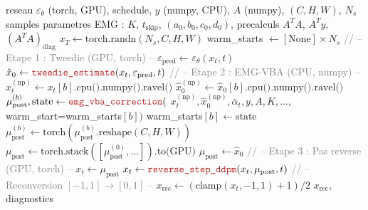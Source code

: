 \documentclass[12pt]{article}
\newcommand{\N}{\mathcal{N}}
\newcommand{\abar}{\bar{\alpha}}
\newcommand{\xhat}{\hat{x}_0}
\newcommand{\mupost}{\mu_{\mathrm{post}}}
\newcommand{\file}[1]{\texttt{\color{codeblue}#1}}
\newcommand{\func}[1]{\texttt{\color{codered}#1}}
\begin{document}
\begin{algorithm}[H]
\caption{Echantillonnage conditionnel complet --- \file{Reverse.py} $\to$ \func{sample\_conditional}}
\begin{algorithmic}[1]
\Require reseau $\varepsilon_\theta$ (torch, GPU), schedule, $y$ (numpy, CPU), $A$ (numpy), $(C,H,W)$, $N_s$ samples
\Require parametres EMG : $K$, $t_{\text{skip}}$, $(a_0, b_0, c_0, d_0)$, precalculs $A^TA$, $A^Ty$, $(A^TA)_{\text{diag}}$
\State
\State $x_T \gets \text{torch.randn}(N_s, C, H, W)$ \Comment{$x_T \sim \N(0,I)$, GPU}
\State warm\_starts $\gets [\text{None}] \times N_s$ 
\State
{} 
  \State
  \State \textcolor{gray}{// -- Etape 1 : Tweedie (GPU, torch) --}
  \State $\varepsilon_{\text{pred}} \gets \varepsilon_\theta(x_t, t)$ 
  \State $\xhat \gets \func{tweedie\_estimate}(x_t, \varepsilon_{\text{pred}}, t)$ 
  \State
  \State \textcolor{gray}{// -- Etape 2 : EMG-VBA (CPU, numpy) --}
   
      \State $x_t^{(\text{np})} \gets x_t[b].\text{cpu().numpy().ravel()}$ 
      \State $\xhat^{(\text{np})} \gets \xhat[b].\text{cpu().numpy().ravel()}$
      \State
      \State $\mupost^{(b)}, \text{state} \gets \func{emg\_vba\_correction}($
      \State \qquad $x_t^{(\text{np})}, \xhat^{(\text{np})}, \abar_t, y, A, K, \ldots,$ warm\_start=warm\_starts$[b])$
      \State
      \State warm\_starts$[b] \gets \text{state}$ 
      \State $\mupost^{(b)} \gets \text{torch}(\mupost^{(b)}.\text{reshape}(C,H,W))$ 
    \EndFor
    \State $\mupost \gets \text{torch.stack}([\mupost^{(0)}, \ldots]).\text{to(GPU)}$
  \Else
    \State $\mupost \gets \xhat$ 
  \EndIf
  \State
  \State \textcolor{gray}{// -- Etape 3 : Pas reverse (GPU, torch) --}
    \State $x_t \gets \mupost$ 
  \Else
    \State $x_t \gets \func{reverse\_step\_ddpm}(x_t, \mupost, t)$ 
  \EndIf
\EndFor
\State
\State \textcolor{gray}{// -- Reconversion $[-1,1] \to [0,1]$ --}
\State $x_{\text{rec}} \gets (\text{clamp}(x_t, -1, 1) + 1) / 2$
\Ensure $x_{\text{rec}}$, diagnostics
\end{algorithmic}
\end{algorithm}
\end{document}

